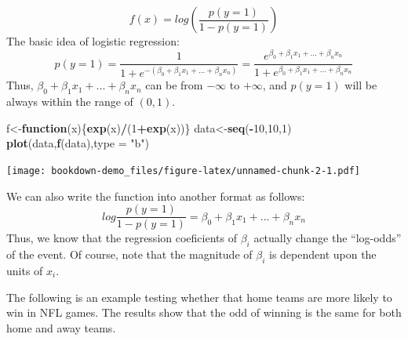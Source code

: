 \documentclass[]{book}
\newenvironment{Shaded}{\begin{snugshade}}{\end{snugshade}}
\newcommand{\ControlFlowTok}[1]{\textcolor[rgb]{0.13,0.29,0.53}{\textbf{#1}}}
\newcommand{\DataTypeTok}[1]{\textcolor[rgb]{0.13,0.29,0.53}{#1}}
\newcommand{\DecValTok}[1]{\textcolor[rgb]{0.00,0.00,0.81}{#1}}
\newcommand{\KeywordTok}[1]{\textcolor[rgb]{0.13,0.29,0.53}{\textbf{#1}}}
\newcommand{\NormalTok}[1]{#1}
\newcommand{\OperatorTok}[1]{\textcolor[rgb]{0.81,0.36,0.00}{\textbf{#1}}}
\newcommand{\StringTok}[1]{\textcolor[rgb]{0.31,0.60,0.02}{#1}}
\begin{document}
\[f(x)=log(\frac{p(y=1)}{1-p(y=1)})\]
The basic idea of logistic regression:
\[p(y=1)=\frac{1}{1+e^{-(\beta_0+\beta_1x_1+...+\beta_nx_n)}}=\frac{e^{\beta_0+\beta_1x_1+...+\beta_nx_n}}{1+e^{\beta_0+\beta_1x_1+...+\beta_nx_n}}\]
Thus, \(\beta_0+\beta_1x_1+...+\beta_nx_n\) can be from \(-\infty\) to \(+\infty\), and \(p(y=1)\) will be always within the range of \((0,1)\).

\begin{Shaded}
\begin{Highlighting}[]
\NormalTok{f<-}\ControlFlowTok{function}\NormalTok{(x)\{}\KeywordTok{exp}\NormalTok{(x)}\OperatorTok{/}\NormalTok{(}\DecValTok{1}\OperatorTok{+}\KeywordTok{exp}\NormalTok{(x))\}}
\NormalTok{data<-}\KeywordTok{seq}\NormalTok{(}\OperatorTok{-}\DecValTok{10}\NormalTok{,}\DecValTok{10}\NormalTok{,}\DecValTok{1}\NormalTok{)}
\KeywordTok{plot}\NormalTok{(data,}\KeywordTok{f}\NormalTok{(data),}\DataTypeTok{type =} \StringTok{"b"}\NormalTok{)}
\end{Highlighting}
\end{Shaded}

\texttt{[image: bookdown-demo\_files/figure-latex/unnamed-chunk-2-1.pdf]}

We can also write the function into another format as follows:
\[log \frac{p(y=1)}{1-p(y=1)}= \beta_0+\beta_1x_1+...+\beta_nx_n\]
Thus, we know that the regression coeficients of \(\beta_i\) actually change the ``log-odds'' of the event. Of course, note that the magnitude of \(\beta_i\) is dependent upon the units of \(x_i\).

The following is an example testing whether that home teams are more likely to win in NFL games. The results show that the odd of winning is the same for both home and away teams.

\begin{Shaded}
\end{Shaded}
\end{document}
